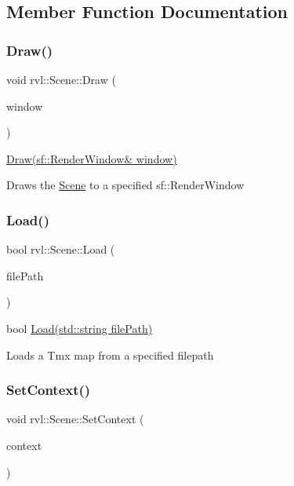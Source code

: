 \subsection{Member Function Documentation}
\mbox{\label{classrvl_1_1_scene_a62dd092ce10da061bb2bbb49eb0607db}} 
\subsubsection{\texorpdfstring{Draw()}{Draw()}}
{\footnotesize\ttfamily void rvl\+::\+Scene\+::\+Draw (\begin{DoxyParamCaption}\item[{sf\+::\+Render\+Window \&}]{window }\end{DoxyParamCaption})}



\hyperlink{classrvl_1_1_scene_a62dd092ce10da061bb2bbb49eb0607db}{Draw(sf\+::\+Render\+Window\& window)} 

Draws the \hyperlink{classrvl_1_1_scene}{Scene} to a specified sf\+::\+Render\+Window \mbox{\label{classrvl_1_1_scene_ab871b7005408e83aaf2df91051338c5f}} 
\subsubsection{\texorpdfstring{Load()}{Load()}}
{\footnotesize\ttfamily bool rvl\+::\+Scene\+::\+Load (\begin{DoxyParamCaption}\item[{std\+::string}]{file\+Path }\end{DoxyParamCaption})}



bool \hyperlink{classrvl_1_1_scene_ab871b7005408e83aaf2df91051338c5f}{Load(std\+::string file\+Path)} 

Loads a Tmx map from a specified filepath \mbox{\label{classrvl_1_1_scene_ae45e2625cb99dd8ccb4a304fa70791bb}} 
\subsubsection{\texorpdfstring{Set\+Context()}{SetContext()}}
{\footnotesize\ttfamily void rvl\+::\+Scene\+::\+Set\+Context (\begin{DoxyParamCaption}\item[{\hyperlink{structrvl_1_1_shared_context}{rvl\+::\+Shared\+Context} $\ast$}]{context }\end{DoxyParamCaption})}



